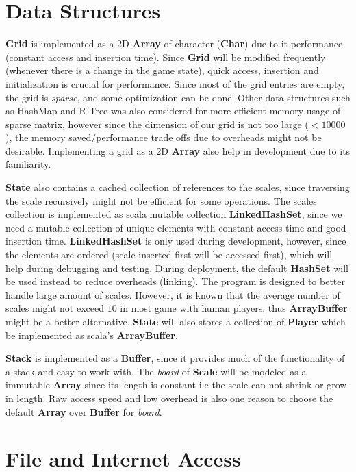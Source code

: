 \documentclass[12pt]{article}
\begin{document}
\section{Data Structures}

\textbf{Grid} is implemented as a 2D \textbf{Array} of character (\textbf{Char})
due to it performance (constant access and insertion time). Since \textbf{Grid}
will be modified frequently (whenever there is a change in the game state),
quick access, insertion and initialization is crucial for performance. Since
most of the grid entries are empty, the grid is \textit{sparse}, and some
optimization can be done. Other data structures such as HashMap and R-Tree was
also considered for more efficient memory usage of sparse matrix, however since
the dimension of our grid is not too large ($< 10000$), the memory
saved/performance trade offs due to overheads might not be desirable.
Implementing a grid as a 2D \textbf{Array} also help in development due to its
familiarity.

\textbf{State} also contains a cached collection of references to the scales,
since traversing the scale recursively might not be efficient for some
operations. The scales collection is implemented as scala mutable collection
\textbf{LinkedHashSet}, since we need a mutable collection of unique elements
with constant access time and good insertion time. \textbf{LinkedHashSet} is
only used during development, however, since the elements are ordered (scale
inserted first will be accessed first), which will help during debugging and
testing. During deployment, the default \textbf{HashSet} will be used instead to
reduce overheads (linking). The program is designed to better handle large
amount of scales. However, it is known that the average number of scales might
not exceed $10$ in most game with human players, thus \textbf{ArrayBuffer} might
be a better alternative. \textbf{State} will also stores a collection of
\textbf{Player} which be implemented as scala's \textbf{ArrayBuffer}.

\textbf{Stack} is implemented as a \textbf{Buffer}, since it provides much of
the functionality of a stack and easy to work with.  The \textit{board} of
\textbf{Scale} will be modeled as a immutable \textbf{Array} since its length is
constant i.e the scale can not shrink or grow in length. Raw access speed and
low overhead is also one reason to choose the default \textbf{Array} over
\textbf{Buffer} for \textit{board}.


\section{File and Internet Access}
\end{document}
